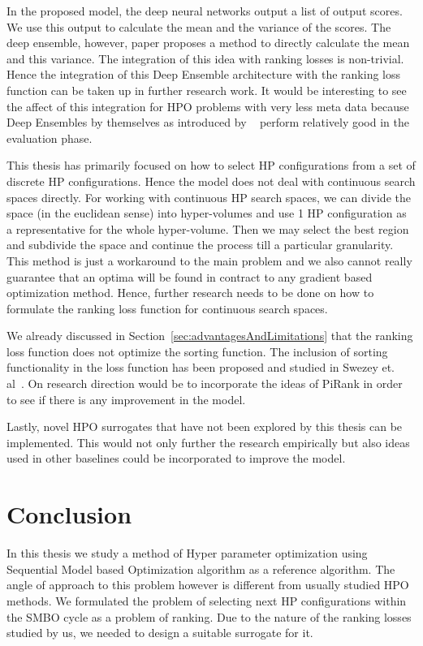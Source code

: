 \documentclass[12pt, twoside, ngerman]{report}
\begin{document}
In the proposed model,  the deep neural networks output a list of output scores. 
We use this output to calculate the mean and the variance of the scores.
The deep ensemble, however, paper proposes a method to directly calculate the mean and this variance.
The integration of this idea with ranking losses is non-trivial.
Hence the integration of this Deep Ensemble architecture with the ranking loss function can be taken up in further research work.
It would be interesting to see the affect of this integration for HPO problems with very less meta data because Deep Ensembles by themselves as introduced by ~\cite{DeepEnsemblePaper} perform relatively good in the evaluation phase.

This thesis has primarily focused on how to select HP configurations from a set of discrete HP configurations.
Hence the model does not deal with continuous search spaces directly.
For working with continuous HP search spaces,  we can divide the space  (in the euclidean sense) into hyper-volumes and use 1 HP configuration as a representative for the whole hyper-volume.
Then we may select the best region and subdivide the space and continue the process till a particular granularity.
This method is just a workaround to the main problem and we also cannot really guarantee that an optima will be found in contract to any gradient based optimization method.
Hence,  further research needs to be done on how to formulate the ranking loss function for continuous search spaces.

We already discussed in Section~\ref{sec:advantagesAndLimitations}  that the ranking loss function does not optimize the sorting function.
The inclusion of sorting functionality in the loss function has  been proposed and studied in Swezey et.  al~\cite{PiRank}.
On research direction would be to incorporate the ideas of PiRank in order to see if there is any improvement in the model.

Lastly,  novel HPO surrogates that have not been explored by this thesis can be implemented.
This would not only further the research empirically but also ideas used in other baselines could be incorporated to improve the model.


\section{Conclusion}
In this thesis we study a method of Hyper parameter optimization using Sequential Model based Optimization algorithm as a reference algorithm.
The angle of approach to this problem however is different from usually studied HPO methods.
We formulated the problem of selecting next HP configurations within the SMBO cycle as a problem of ranking.
Due to the nature of the ranking losses studied by us,  we needed to design a suitable surrogate for it.
\end{document}

